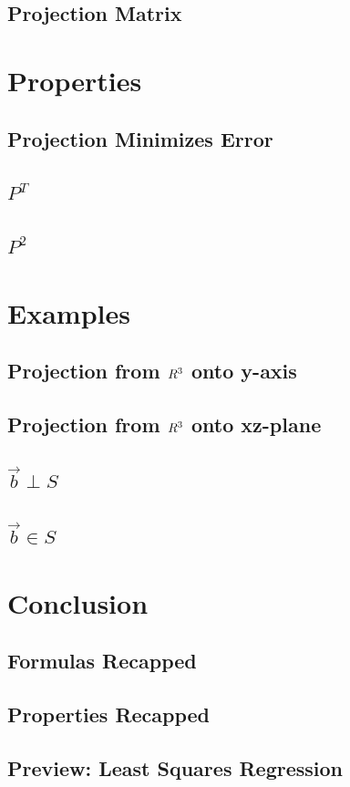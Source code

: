 \documentclass[12pt]{beamer}
\begin{document}
\subsection{Projection Matrix}

\section{Properties}

\subsection{Projection Minimizes Error}

\subsection{$P^T$}

\subsection{$P^2$}

\section{Examples}

\subsection{Projection from $\boldmath{R}^3$ onto y-axis}

\subsection{Projection from $\boldmath{R}^3$ onto xz-plane}

\subsection{$\vec{b} \perp S$}

\subsection{$\vec{b} \in S$}

\section{Conclusion}

\subsection{Formulas Recapped}

\subsection{Properties Recapped}

\subsection{Preview: Least Squares Regression}
\end{document}
